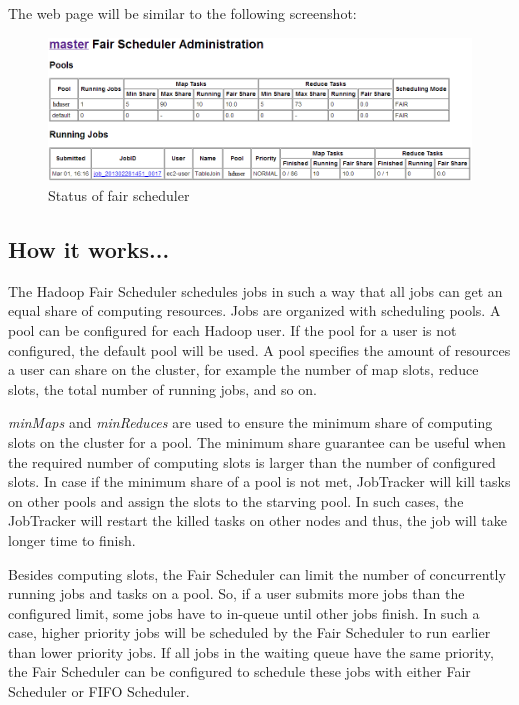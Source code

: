 The web page will be similar to the following screenshot:
\begin{figure}[h]
  \centering
  \includegraphics[width=\textwidth]{figs/5163OS_04_16.png}
  \caption{Status of fair scheduler}\label{fig:fairscheduler}
\end{figure} 

\subsection*{How it works...}
The Hadoop Fair Scheduler schedules jobs in such a way that all jobs can get an equal share of computing resources. Jobs are organized with scheduling pools. A pool can be configured for each Hadoop user. If the pool for a user is not configured, the default pool will be used. A pool specifies the amount of resources a user can share on the cluster, for example the number of map slots, reduce slots, the total number of running jobs, and so on.

\emph{minMaps} and \emph{minReduces} are used to ensure the minimum share of computing slots on the cluster for a pool. The minimum share guarantee can be useful when the required number of computing slots is larger than the number of configured slots. In case if the minimum share of a pool is not met, JobTracker will kill tasks on other pools and assign the slots to the starving pool. In such cases, the JobTracker will restart the killed tasks on other nodes and thus, the job will take longer time to finish.

Besides computing slots, the Fair Scheduler can limit the number of concurrently running jobs and tasks on a pool. So, if a user submits more jobs than the configured limit, some jobs have to in-queue until other jobs finish. In such a case, higher priority jobs will be scheduled by the Fair Scheduler to run earlier than lower priority jobs. If all jobs in the waiting queue have the same priority, the Fair Scheduler can be configured to schedule these jobs with either Fair Scheduler or FIFO Scheduler.

